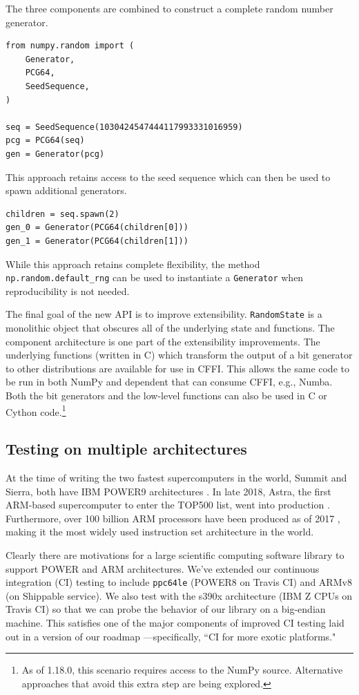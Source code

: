 \documentclass[twocolumn]{article}
\begin{document}
The three components are combined to construct a complete random number
generator.

\begin{lstlisting}
from numpy.random import (
    Generator,
    PCG64,
    SeedSequence,
)

seq = SeedSequence(1030424547444117993331016959)
pcg = PCG64(seq)
gen = Generator(pcg)
\end{lstlisting}

This approach retains access to the seed sequence which can then be
used to spawn additional generators.

\begin{lstlisting}
children = seq.spawn(2)
gen_0 = Generator(PCG64(children[0]))
gen_1 = Generator(PCG64(children[1]))
\end{lstlisting}

While this approach retains complete flexibility, the method
\texttt{np.random.default\_rng} can be used to instantiate a \texttt{Generator} when
reproducibility is not needed.

The final goal of the new API is to improve extensibility. \texttt{RandomState} is
a monolithic object that obscures all of the underlying state and functions. The
component architecture is one part of the extensibility improvements. The
underlying functions (written in C) which transform the output of a bit
generator to other distributions are available for use in CFFI. This allows the
same code to be run in both NumPy and dependent that can consume CFFI, e.g.,
Numba. Both the bit generators and the low-level functions can also be used in C
or Cython code.\footnote{As of 1.18.0, this scenario requires access to the
NumPy source. Alternative approaches that avoid this extra step are being
explored.}

\subsection*{Testing on multiple architectures}

At the time of writing the two fastest supercomputers in the
world, Summit and Sierra, both have IBM POWER9 architectures
\cite{top500nov2019}. In late 2018, Astra, the first ARM-based
supercomputer to enter the TOP500 list, went into production
\cite{astra-wiki}. Furthermore, over 100 billion ARM processors have been
produced as of 2017 \cite{arm-architecture}, making it the most 
widely used instruction set architecture in the world.

Clearly there are motivations for a large scientific computing
software library to support POWER and ARM architectures. We've extended
our continuous integration (CI) testing to include \texttt{ppc64le}
(POWER8 on Travis CI) and ARMv8 (on Shippable service). We also test
with the s390x architecture (IBM Z CPUs on Travis CI) so that we
can probe the behavior of our library on a big-endian machine.
This satisfies one of the major components of
improved CI testing laid out in a version of our roadmap
\cite{numpy-roadmap}---specifically, ``CI for more exotic
platforms."
\end{document}
